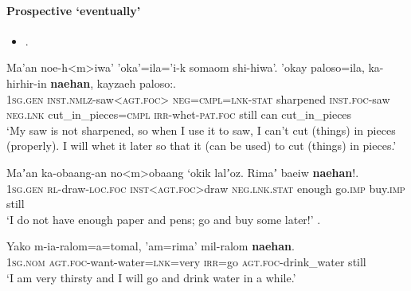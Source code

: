 \paragraph{Prospective \lq eventually\rq{}}\label{appendixSaisiyatProspective}
\begin{itemize}
	\item \textcite[154]{ZeitounEtal2015}.
\end{itemize}
\begin{exe}
	\ex\label{exAppendixSaisiyatLater1}
	\gll Ma’an noe-h<m>iwa' 'oka'=ila='i-k somaom	shi-hiwa’. 'okay	paloso=ila, ka-hirhir-in \textbf{naehan}, kayzaeh paloso:.\\
	1\textsc{sg}.\textsc{gen} \textsc{inst}.\textsc{nmlz}-saw<\textsc{agt}.\textsc{foc}> \textsc{neg}=\textsc{cmpl}=\textsc{lnk}-\textsc{stat}	sharpened \textsc{inst}.\textsc{foc}-saw \textsc{neg}.\textsc{lnk} cut\_in\_pieces=\textsc{cmpl} \textsc{irr}-whet-\textsc{pat}.\textsc{foc} still can cut\_in\_pieces\\
	\glt \lq My saw is not sharpened, so when I use it to saw, I can’t cut (things) in pieces (properly). I will whet it later so that it (can be used) to cut (things) in pieces.' \parencite[506]{ZeitounEtal2015}
	
	\ex\label{exAppendixSaisiyatLater2}
	\gll Maʼan ka-obaang-an no<m>obaang \lq{}okik lalʼoz. Rimaʼ baeiw \textbf{naehan}!.\\
	1\textsc{sg}.\textsc{gen} \textsc{rl}-draw-\textsc{loc}.\textsc{foc} \textsc{inst}<\textsc{agt}.\textsc{foc}>draw \textsc{neg}.\textsc{lnk}.\textsc{stat} enough go.\textsc{imp} buy.\textsc{imp} still\\
	\glt \lq I do not have enough paper and pens; go and buy some later!\rq{ }\parencite[506]{ZeitounEtal2015}.

	\ex\label{exAppendixSaisiyatLater3}
	\gll Yako m-ia-ralom=a=tomal, \rq{}am=rima\rq{} mil-ralom \textbf{naehan}.\\
	1\textsc{sg}.\textsc{nom} \textsc{agt}.\textsc{foc}-want-water=\textsc{lnk}=very \textsc{irr}=go \textsc{agt}.\textsc{foc}-drink\_water still\\
	\glt \lq I am very thirsty and I will go and drink water in a while.\rq{ }\parencite[504]{ZeitounEtal2015}
\end{exe}
\pagebreak

